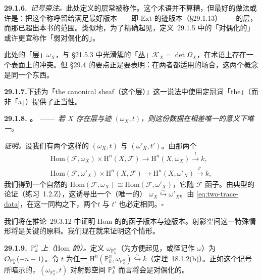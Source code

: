 \textbf{29.1.6.}\ \emph{记号旁注。}\quad 此处定义的\trCanonical{}层常被称作\textbf{\trDualizingSheaf}。这个术语并不算糟，但最好的做法或许是：把这个称呼留给满足\trSerreDuality{}最好版本——即 $\mathrm{Ext}$ 的迹版本（\S29.1.13）——的层，而那已超出本书的范围。类似地，为了精确起见，\mbox{定义~29.1.5} 中的「对偶化的」或许更宜称作「弱对偶化的」。

此处的「\trCanonical{}层」$\omega_X$，与 \S21.5.3 中光滑簇的「\trCanonical{}丛」$\mathscr{K}_X=\det\Omega_X$，在术语上存在一个表面上的冲突。但 \S29.4 的要点正是要表明：在两者都适用的场合，这两个概念是同一个东西。

\textbf{29.1.7.}\quad 下述\trhProposition{}为「the canonical sheaf（这个\trCanonical{}层）」这一说法中使用定冠词「the」（而非「a」）提供了正当性。

\textbf{29.1.8. \trhProposition。}\ ——\ \emph{若 $X$ 存在\trCanonical{}层与迹 $(\omega_X,t)$，则这份数据在相差唯一\trIsomorphism{}的意义下唯一。}

\emph{证明。}\quad 设我们有两个这样的 $(\omega_X,t)$ 与 $(\omega'_X,t')$。由那两个\trMorphism
\begin{equation*}\tag{29.1.8.1}\label{eq:two-trace-data}
\begin{gathered}
\mathrm{Hom}(\mathscr{F},\omega_X)\times\mathrm{H}^n(X,\mathscr{F})\longrightarrow\mathrm{H}^n(X,\omega_X)\overset{t}{\longrightarrow}k,\\[1.4em]
\mathrm{Hom}(\mathscr{F},\omega'_X)\times\mathrm{H}^n(X,\mathscr{F})\longrightarrow\mathrm{H}^n(X,\omega'_X)\overset{t'}{\longrightarrow}k,
\end{gathered}
\end{equation*}
我们得到一个自然的\trBijection{} $\mathrm{Hom}(\mathscr{F},\omega_X)\cong\mathrm{Hom}(\mathscr{F},\omega'_X)$，它随 $\mathscr{F}$ 函子。由典型的\trUniversalProperty{}论证（\mbox{练习~1.2.Z}），这诱导出一个（唯一的）\trIsomorphism{} $\omega_X\overset{\sim}{\hookrightarrow}\omega'_X$。由 \eqref{eq:two-trace-data}，在这一同构之下，两个\trTraceMap $t$ 与 $t'$ 也必定相同。\hfill$\square$

我们将在\mbox{推论~29.3.12} 中证明 $\mathrm{Hom}$ 的\trSerreDuality{}的函子版本与迹版本。射影空间这一特殊情形将是关键的原料。我们现在就来证明这个情形。

\textbf{29.1.9.}\ \emph{$\mathbb{P}^n_k$ 上（$\mathrm{Hom}$ 的）\trSerreDuality。}\quad 定义 $\omega_{\mathbb{P}^n_k}$（为方便起见，或径记作 $\omega$）为 $\mathcal{O}_{\mathbb{P}^n_k}(-n-1)$。令 $t$ 为任一\trIsomorphism{} $\mathrm{H}^n(\mathbb{P}^n_k,\omega_{\mathbb{P}^n_k})\overset{\sim}{\hookrightarrow}k$（\mbox{定理~18.1.2}(b)）。正如这个记号所暗示的，$(\omega_{\mathbb{P}^n_k},t)$ 对射影空间 $\mathbb{P}^n_k$ 而言将会是对偶化的。

